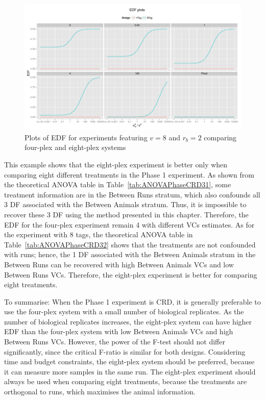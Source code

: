 \documentclass[12pt,a4paper]{article}
\begin{document}
\begin{figure}[ht]
\centering
\includegraphics[width=1 \textwidth]{Graph/CRD822Tag4vsTag8.pdf}
\caption{Plots of EDF for experiments featuring $v = 8$ and $r_b = 2$ comparing four-plex and eight-plex systems}
\label{fig:compare82CRD}
\end{figure}

This example shows that the eight-plex experiment is better only when comparing eight different treatments in the Phase 1 experiment. As shown from the theoretical ANOVA table in Table~\ref{tab:ANOVAPhaseCRD31}, some treatment information are in the Between Runs stratum, which also confounds all 3 DF associated with the Between Animals stratum. Thus, it is impossible to recover these 3 DF using the method presented in this chapter. Therefore, the EDF for the four-plex experiment remain 4 with different VCs estimates. As for the experiment with 8 tags, the theoretical ANOVA table in Table~\ref{tab:ANOVAPhaseCRD32} shows that the treatments are not confounded with runs; hence, the 1 DF associated with the Between Animals stratum in the Between Runs can be recovered with high Between Animals VCs and low Between Runs VCs. Therefore, the eight-plex experiment is better for comparing eight treatments.  

To summarise: When the Phase 1 experiment is CRD, it is generally preferable to use the four-plex system with a small number of biological replicates. As the number of biological replicates increases, the eight-plex system can have higher EDF than the four-plex system with low Between Animals VCs and high Between Runs VCs. However, the power of the F-test should not differ significantly, since the critical F-ratio is similar for both designs. Considering time and budget constraints, the eight-plex system should be preferred, because it can measure more samples in the same run. The eight-plex experiment should always be used when comparing eight treatments, because the treatments are orthogonal to runs, which maximises the animal information. 
\end{document}
